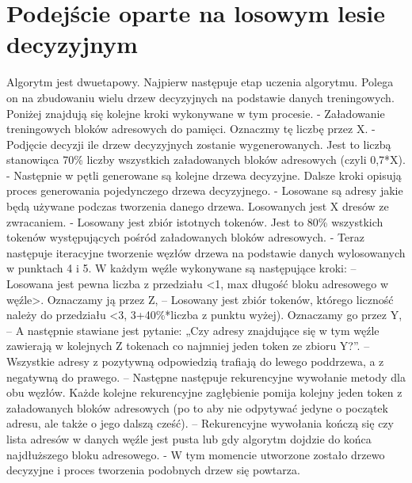 \documentclass[a4paper,oneside,12pt]{article}
\begin{document}
\section{Podejście oparte na losowym lesie decyzyjnym}
Algorytm jest dwuetapowy.
Najpierw następuje etap uczenia algorytmu. Polega on na zbudowaniu wielu drzew decyzyjnych na podstawie danych treningowych. Poniżej znajdują się kolejne kroki wykonywane w tym procesie.
-	Załadowanie treningowych bloków adresowych do pamięci. Oznaczmy tę liczbę przez X.
-	Podjęcie decyzji ile drzew decyzyjnych zostanie wygenerowanych. Jest to liczbą stanowiąca 70\% liczby wszystkich załadowanych bloków adresowych (czyli 0,7*X).
-	Następnie w pętli generowane są kolejne drzewa decyzyjne. Dalsze kroki opisują proces generowania pojedynczego drzewa decyzyjnego.
-	Losowane są adresy jakie będą używane podczas tworzenia danego drzewa.  Losowanych jest X dresów ze zwracaniem.
-	Losowany jest zbiór istotnych tokenów. Jest to 80\% wszystkich tokenów występujących pośród załadowanych bloków adresowych.
-	Teraz następuje iteracyjne tworzenie węzłów drzewa na podstawie danych wylosowanych w punktach 4 i 5. W każdym węźle wykonywane są następujące kroki:
--	Losowana jest pewna liczba z przedziału <1, max długość bloku adresowego w węźle>. Oznaczamy ją przez Z,
--	Losowany jest zbiór tokenów, którego liczność należy do przedziału <3, 3+40\%*liczba z punktu wyżej). Oznaczamy go przez Y,
--	A następnie stawiane jest pytanie: „Czy adresy znajdujące się w tym węźle zawierają w kolejnych Z tokenach co najmniej jeden token ze zbioru Y?”.
--	Wszystkie adresy z pozytywną odpowiedzią trafiają do lewego poddrzewa, a z negatywną do prawego.
--	Następne następuje rekurencyjne wywołanie metody dla obu węzłów. Każde kolejne rekurencyjne zagłębienie pomija kolejny jeden token z załadowanych  bloków adresowych (po to aby nie odpytywać jedyne o początek adresu, ale także o jego dalszą cześć).
--	Rekurencyjne wywołania kończą się czy lista adresów w danych węźle jest pusta lub gdy algorytm dojdzie do końca najdłuższego bloku adresowego.
-	W tym momencie utworzone zostało drzewo decyzyjne i proces tworzenia podobnych drzew się powtarza.
\end{document}

